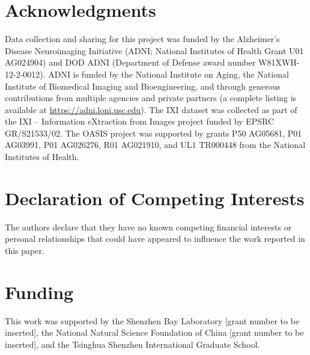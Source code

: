 \documentclass[12pt,a4paper]{article}
\begin{document}
\section*{Acknowledgments}
Data collection and sharing for this project was funded by the Alzheimer's Disease Neuroimaging Initiative (ADNI; National Institutes of Health Grant U01 AG024904) and DOD ADNI (Department of Defense award number W81XWH-12-2-0012). ADNI is funded by the National Institute on Aging, the National Institute of Biomedical Imaging and Bioengineering, and through generous contributions from multiple agencies and private partners (a complete listing is available at \url{https://adni.loni.usc.edu}). The IXI dataset was collected as part of the IXI -- Information eXtraction from Images project funded by EPSRC GR/S21533/02. The OASIS project was supported by grants P50 AG05681, P01 AG03991, P01 AG026276, R01 AG021910, and UL1 TR000448 from the National Institutes of Health.

\section*{Declaration of Competing Interests}
The authors declare that they have no known competing financial interests or personal relationships that could have appeared to influence the work reported in this paper.

\section*{Funding}
This work was supported by the Shenzhen Bay Laboratory [grant number to be inserted], the National Natural Science Foundation of China [grant number to be inserted], and the Tsinghua Shenzhen International Graduate School.


\end{document}
